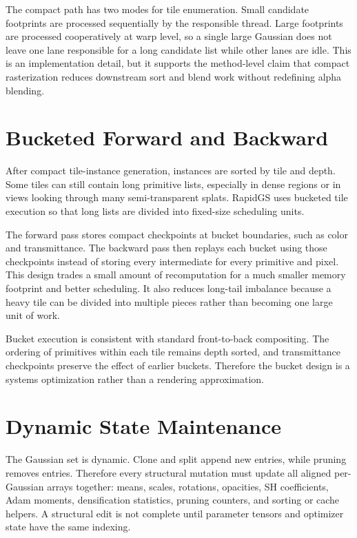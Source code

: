 The compact path has two modes for tile enumeration. Small candidate footprints are processed sequentially by the responsible thread. Large footprints are processed cooperatively at warp level, so a single large Gaussian does not leave one lane responsible for a long candidate list while other lanes are idle. This is an implementation detail, but it supports the method-level claim that compact rasterization reduces downstream sort and blend work without redefining alpha blending.

\section{Bucketed Forward and Backward}

After compact tile-instance generation, instances are sorted by tile and depth. Some tiles can still contain long primitive lists, especially in dense regions or in views looking through many semi-transparent splats. RapidGS uses bucketed tile execution so that long lists are divided into fixed-size scheduling units.

The forward pass stores compact checkpoints at bucket boundaries, such as color and transmittance. The backward pass then replays each bucket using those checkpoints instead of storing every intermediate for every primitive and pixel. This design trades a small amount of recomputation for a much smaller memory footprint and better scheduling. It also reduces long-tail imbalance because a heavy tile can be divided into multiple pieces rather than becoming one large unit of work.

Bucket execution is consistent with standard front-to-back compositing. The ordering of primitives within each tile remains depth sorted, and transmittance checkpoints preserve the effect of earlier buckets. Therefore the bucket design is a systems optimization rather than a rendering approximation.

\section{Dynamic State Maintenance}

The Gaussian set is dynamic. Clone and split append new entries, while pruning removes entries. Therefore every structural mutation must update all aligned per-Gaussian arrays together: means, scales, rotations, opacities, SH coefficients, Adam moments, densification statistics, pruning counters, and sorting or cache helpers. A structural edit is not complete until parameter tensors and optimizer state have the same indexing.

